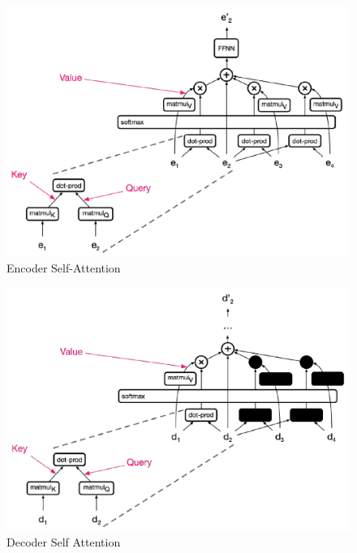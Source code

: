 \begin{minipage}{.5\linewidth}
    \begin{figure}[H]
        \centering
        \includegraphics[width=0.95\linewidth]{images/seq-transformer-5}
        \caption[Encoder Self-Attention]{Encoder Self-Attention}
        \label{fig:seq-transformer-5}
    \end{figure}
\end{minipage}
\begin{minipage}{.5\linewidth}
    \begin{figure}[H]
        \centering
        \includegraphics[width=0.95\linewidth]{images/seq-transformer-6}
        \caption[Decoder Self Attention]{Decoder Self Attention}
        \label{fig:seq-transformer-6}
    \end{figure}
\end{minipage}

